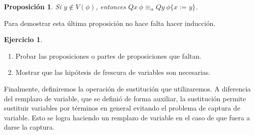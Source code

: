 \documentclass[a4paper, 12pt]{report}
\newtheorem{prop}[teorema]{Proposición}
\theoremstyle{definition}
\newtheorem{ejercicio}{Ejercicio}[section]
\begin{document}
\begin{prop}\label{prop-alphaEquivCV}
	Si $y\not\in V(\phi)$, entonces $Qx~\phi\equiv_\alpha Qy~\phi\{x:=y\}$.
\end{prop}
Para demostrar esta última proposición no hace falta hacer inducción.

\begin{ejercicio}
	\begin{enumerate}
		\item Probar las proposiciones o partes de proposiciones que faltan.
		\item Mostrar que las hipótesis de frescura de variables son necesarias.
	\end{enumerate}
	
\end{ejercicio}

Finalmente, definiremos la operación de sustitución que utilizaremos. A diferencia del remplazo de variable, que se definió de forma auxiliar, la sustitución permite sustituir variables por términos en general evitando el problema de captura de variable. Esto se logra haciendo un remplazo de variable en el caso de que fuera a darse la captura.
\end{document}
